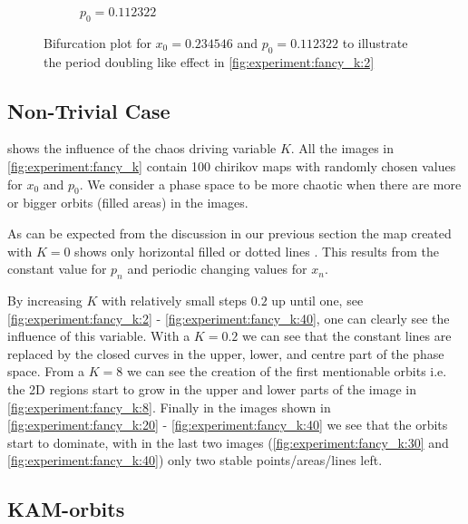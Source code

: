 \begin{figure}
\begin{subfigure}{\columnwidth}
			\caption{$p_0 = \num{0.112322}$}
			\label{fig:experiment:bifurcation:p}
	\end{subfigure}
	\caption{Bifurcation plot for $x_0 = \num{0.234546}$ and $p_0 = \num{0.112322}$ to illustrate the period doubling like effect in \cref{fig:experiment:fancy_k:2}}
	\label{fig:experiment:bifurcation}
\end{figure}

\subsection{Non-Trivial Case}
\label{ss:b:nontrivial}
 shows the influence of the chaos driving variable $K$. All the images in \cref{fig:experiment:fancy_k} contain 100 chirikov maps with randomly chosen values for $x_0$ and $p_0$. We consider a phase space to be more chaotic when there are more or bigger orbits (filled areas) in the images. 

As can be expected from the discussion in our previous section the map created with $K = 0$ shows only horizontal filled or dotted lines . This results from the constant value for $p_n$ and periodic changing values for $x_n$. 

By increasing $K$ with relatively small steps $0.2$ up until one, see \cref{fig:experiment:fancy_k:2} - \ref{fig:experiment:fancy_k:40}, one can clearly see the influence of this variable. With a $K = 0.2$ we can see that the constant lines are replaced by the closed curves in the upper, lower, and centre part of the phase space. From a $K = 8$ we can see the creation of the first mentionable orbits i.e. the 2D regions start to grow in the upper and lower parts of the image in \cref{fig:experiment:fancy_k:8}.  Finally in the images shown in \cref{fig:experiment:fancy_k:20} - \ref{fig:experiment:fancy_k:40} we see that the orbits start to dominate, with in the last two images (\cref{fig:experiment:fancy_k:30} and \ref{fig:experiment:fancy_k:40}) only two stable points/areas/lines left. 




\subsection{KAM-orbits}
\label{ss:b:kam}
